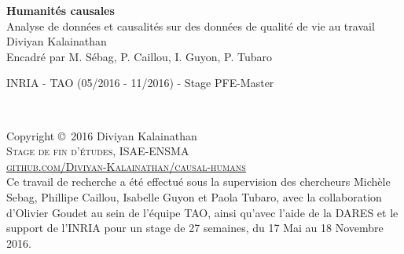 \documentclass[11pt,fleqn,a4paper,openany,frenchb]{book} %
\begin{document}

\begingroup
\thispagestyle{empty}
\centering
\vspace*{5cm}
\par\normalfont\fontsize{35}{35}\sffamily\selectfont
\textbf{Humanités causales}\\
{\LARGE Analyse de données et causalités sur des données de qualité de vie au travail} \\%
\vspace*{0.5cm}
{\Huge Diviyan Kalainathan}\\
{\huge Encadré par M. Sébag, P. Caillou, I. Guyon, P. Tubaro}\par %
{\Large INRIA - TAO (05/2016 - 11/2016) - Stage PFE-Master}\par
\endgroup


\newpage
~\vfill
\thispagestyle{empty}

\noindent Copyright \copyright\ 2016 Diviyan Kalainathan\\ %

\noindent \textsc{Stage de fin d'études, ISAE-ENSMA}\\

\noindent \textsc{\href{https://github.com/Diviyan-Kalainathan/causal-humans}{github.com/Diviyan-Kalainathan/causal-humans}}\\ %


\noindent Ce travail de recherche a été effectué sous la supervision des chercheurs Michèle Sebag, Phillipe Caillou, Isabelle Guyon et Paola Tubaro, avec la collaboration  d'Olivier Goudet au sein de l'équipe TAO, ainsi qu'avec l'aide de la DARES et le support de l'INRIA pour un stage de 27 semaines, du 17 Mai au 18 Novembre 2016. \\ %


\end{document}
